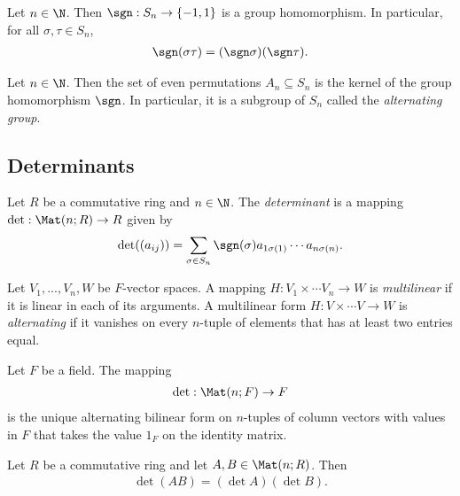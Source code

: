 \documentclass{article}
\begin{document}
\begin{lemma}[Notes 4.1.5]
    Let $n\in\N$. Then $\sgn:S_n\to\{-1,1\}$ is a group homomorphism. In particular, for all $\sigma,\tau\in S_n$,
    \begin{align*}
        \sgn(\sigma\tau) = (\sgn\sigma)(\sgn\tau).
    \end{align*}
\end{lemma}

\begin{definition}
    Let $n\in\N$. Then the set of even permutations $A_n\subseteq S_n$ is the kernel of the 
    group homomorphism $\sgn$. In particular, it is a subgroup of $S_n$ called the \emph{alternating
    group}.
\end{definition}

\subsection{Determinants}

\begin{definition}
    Let $R$ be a commutative ring and $n\in\N$. The \emph{determinant} is a mapping 
    $\det:\Mat(n;R)\to R$ given by 
    \begin{align*}
        \det((a_{ij}))=\sum_{\sigma\in S_n}\sgn(\sigma)a_{1\sigma(1)}\cdots a_{n\sigma(n)}.
    \end{align*}
\end{definition}

\begin{definition}
    Let $V_1,...,V_n,W$ be $F$-vector spaces. A mapping $H:V_1\times\cdots V_n\to W$
    is \emph{multilinear} if it is linear in each of its arguments. A multilinear form 
    $H:V\times \cdots V\to W$ is \emph{alternating} if it vanishes on every $n$-tuple of 
    elements that has at least two entries equal.
\end{definition}

\begin{theorem}[Notes 4.3.6]
    Let $F$ be a field. The mapping 
    \begin{align*}
        \det : \Mat(n; F) \to F
    \end{align*}
    is the unique alternating bilinear form on $n$-tuples of column vectors with values in $F$
    that takes the value $1_F$ on the identity matrix.
\end{theorem}

\begin{theorem}[Notes 4.4.1]
    Let $R$ be a commutative ring and let $A,B\in\Mat(n; R)$. Then 
    \begin{align*}
        \det (AB) = (\det A) (\det B).
    \end{align*} 
\end{theorem}
\end{document}
